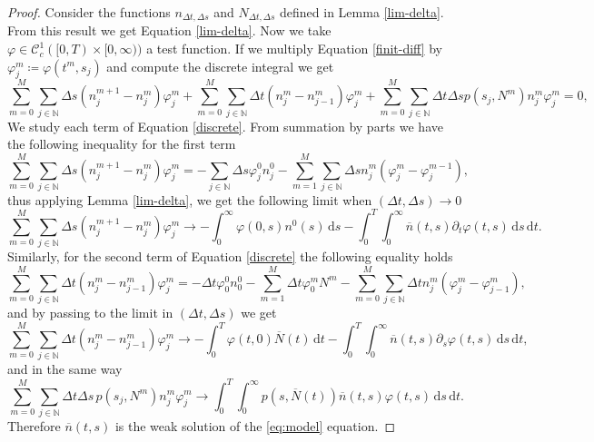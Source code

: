 \documentclass[11pt,a4paper]{article}
\newcommand{\N}{\mathbb{N}}
\newcommand{\dd}{\mathrm{d}}
\begin{document}
\begin{proof}
    Consider the functions $n_{\Delta t,\Delta s}$ and $N_{\Delta t,\Delta s}$ defined in Lemma \ref{lim-delta}. From this result we get Equation \eqref{lim-delta}. Now we take $\varphi\in\mathcal{C}^1_c([0,T)\times[0,\infty))$ a test function. If we multiply Equation \eqref{finit-diff} by $\varphi_j^m\coloneqq\varphi(t^m,s_j)$ and compute the discrete integral we get
    \begin{equation}
    \label{discrete}
      \sum_{m=0}^{M}\sum_{j\in\N}\Delta s(n_j^{m+1}-n_j^m)\varphi_j^m+\sum_{m=0}^{M}\sum_{j\in\N}\Delta t(n_j^m-n_{j-1}^m)\varphi_j^m+\sum_{m=0}^{M}\sum_{j\in\N}\Delta t\Delta s p(s_j,N^m)n_j^m\varphi_j^m=0,  
    \end{equation}
    We study each term of Equation \eqref{discrete}. From summation by parts we have the following inequality for the first term
    \begin{equation*}
       \sum_{m=0}^{M}\sum_{j\in\N}\Delta s(n_j^{m+1}-n_j^m)\varphi_j^m =-\sum_{j\in\N}\Delta s\varphi^0_j n^0_j-\sum_{m=1}^{M}\sum_{j\in\N}\Delta s n^{m}_{j}(\varphi^{m}_j-\varphi^{m-1}_j),
    \end{equation*}
    thus applying Lemma \ref{lim-delta}, we get the following limit when $(\Delta t,\Delta s)\to 0$
    \begin{equation*}
        \sum_{m=0}^{M}\sum_{j\in\N}\Delta s(n_j^{m+1}-n_j^m)\varphi_j^m \to -\int_0^\infty\varphi(0,s)n^0(s)\,\dd s-\int_0^T\int_0^\infty \overline{n}(t,s)\partial_t\varphi(t,s)\,\dd s\,\dd t.
    \end{equation*}
    Similarly, for the second term of Equation \eqref{discrete} the following equality holds
    \begin{equation*}
          \sum_{m=0}^{M}\sum_{j\in\N}\Delta t(n_j^m-n_{j-1}^m)\varphi_j^m =-\Delta t \varphi_0^0 n^0_0 -\sum_{m=1}^{M}\Delta t \varphi_{0}^m N^m - \sum_{m=0}^{M}\sum_{j\in\N}\Delta t n^m_{j}(\varphi^m_{j}-\varphi^m_{j-1}), 
    \end{equation*}
    and by passing to the limit in $(\Delta t,\Delta s)$ we get
      \begin{equation*}
       \sum_{m=0}^{M}\sum_{j\in\N}\Delta t(n_j^m-n_{j-1}^m)\varphi_j^m  \to -\int_0^T\varphi(t,0)\overline{N}(t)\,\dd t-\int_0^T\int_0^\infty \overline{n}(t,s)\partial_s\varphi(t,s)\,\dd s\,\dd t,
    \end{equation*}
    and in the same way
    \begin{equation*}
    \sum_{m=0}^{M}\sum_{j\in\N}\Delta t\Delta s\,p(s_j,N^m)n_j^m\varphi_j^m\to \int_0^T\int_0^\infty p(s,\overline{N}(t))\overline{n}(t,s)\varphi(t,s)\,\dd s\,\dd t.
    \end{equation*}
    Therefore $\overline{n}(t,s)$ is the weak solution of the \eqref{eq:model} equation.
\end{proof}
\end{document}
